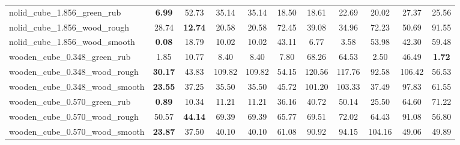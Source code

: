 \begin{table}[H]
{\begin{tabular}{l cccccccccc}
        nolid\_cube\_1.856\_green\_rub & \textbf{6.99} & 52.73 & 35.14 & 35.14 & 18.50 & 18.61 & 22.69 & 20.02 & 27.37 & 25.56 \\
        nolid\_cube\_1.856\_wood\_rough & 28.74 & \textbf{12.74} & 20.58 & 20.58 & 72.45 & 39.08 & 34.96 & 72.23 & 50.69 & 91.55 \\
        nolid\_cube\_1.856\_wood\_smooth & \textbf{0.08} & 18.79 & 10.02 & 10.02 & 43.11 & 6.77 & 3.58 & 53.98 & 42.30 & 59.48 \\
        wooden\_cube\_0.348\_green\_rub & 1.85 & 10.77 & 8.40 & 8.40 & 7.80 & 68.26 & 64.53 & 2.50 & 46.49 & \textbf{1.72} \\
        wooden\_cube\_0.348\_wood\_rough & \textbf{30.17} & 43.83 & 109.82 & 109.82 & 54.15 & 120.56 & 117.76 & 92.58 & 106.42 & 56.53 \\
        wooden\_cube\_0.348\_wood\_smooth & \textbf{23.55} & 37.25 & 35.50 & 35.50 & 45.72 & 101.20 & 103.33 & 37.49 & 97.83 & 61.55 \\
        wooden\_cube\_0.570\_green\_rub & \textbf{0.89} & 10.34 & 11.21 & 11.21 & 36.16 & 40.72 & 50.14 & 25.50 & 64.60 & 71.22 \\
        wooden\_cube\_0.570\_wood\_rough & 50.57 & \textbf{44.14} & 69.39 & 69.39 & 65.77 & 69.51 & 72.02 & 64.43 & 91.08 & 56.80 \\
        wooden\_cube\_0.570\_wood\_smooth & \textbf{23.87} & 37.50 & 40.10 & 40.10 & 61.08 & 90.92 & 94.15 & 104.16 & 49.06 & 49.89 \\
        \bottomrule
    \end{tabular}
    }
\end{table}



\vspace{1cm}

\clearpage

